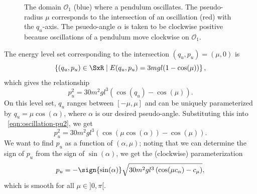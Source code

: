\begin{figure}
    \centering
    
    \caption{The domain \(\mathcal{O}_1\) (blue) where a pendulum oscillates.
    The pseudo-radius \(\mu\) corresponds to the
    intersection of an oscillation (red) with the \(q_u\)-axis.
    The psuedo-angle \(\alpha\) is taken to be clockwise positive because 
    oscillations of a pendulum move clockwise on \(\mathcal{O}_1\).}
    \label{fig:mu-intersection}
\end{figure}

The energy level set corresponding to the intersection \((q_u,p_u) = (\mu,0)\)
is 
\[
    \left\{(q_u,p_u) \in \SxR \mid E(q_u,p_u) = 3mgl(1- \cos(\mu))\right\}
    ,
\]
which gives the relationship
\begin{equation}\label{eqn:oscillation-pu2}
    p_u^2 = 30m^2gl^3\left(\cos(q_u) - \cos(\mu)\right)
    .
\end{equation}
On this level set, \(q_u\) ranges between \([-\mu,\mu]\) and can be uniquely
parameterized by \(q_u = \mu \cos(\alpha)\), where \(\alpha\) is our
desired pseudo-angle.
Substituting this into ~\eqref{eqn:oscillation-pu2}, we get
\[
    p_u^2 = 30m^2gl^3\left(\cos(\mu \cos(\alpha)) - \cos(\mu)\right)
    .
\]
We want to find \(p_u\) as a function of \((\alpha,\mu)\); noting that we can
determine the sign of \(p_u\) from the sign of \(\sin(\alpha)\), we get the
(clockwise) parameterization
\begin{equation}\label{eqn:oscillation-pu}
    p_u = -\sign{\sin(\alpha)} \sqrt{30m^2gl^3 \left(\cos(\mu c_\alpha) - c_\mu\right)}
    ,
\end{equation}
which is smooth for all \(\mu \in ]0,\pi[\).

